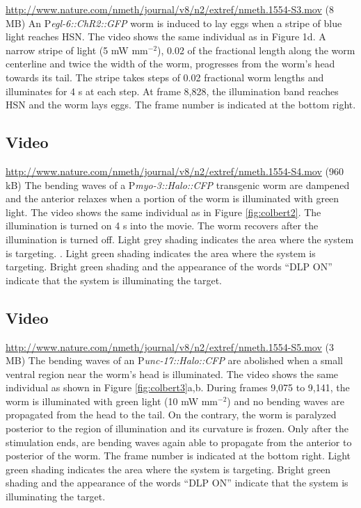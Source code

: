 \url{http://www.nature.com/nmeth/journal/v8/n2/extref/nmeth.1554-S3.mov} (8 MB)
An P\textit{egl-6::ChR2::GFP} worm is induced to lay eggs when a stripe of blue light reaches HSN. The video shows the same individual as in Figure 1d. A narrow stripe of light (5 mW mm$^{−2}$), 0.02 of the fractional length along the worm centerline and twice the width of the worm, progresses from the worm's head towards its tail. The stripe takes steps of 0.02 fractional worm lengths and illuminates for 4 s at each step. At frame 8,828, the illumination band reaches HSN and the worm lays eggs. The frame number is indicated at the bottom right.

\subsection{Video}\label{movie:colbert3} %

\url{http://www.nature.com/nmeth/journal/v8/n2/extref/nmeth.1554-S4.mov} (960 kB)
The bending waves of a P\textit{myo-3::Halo::CFP} transgenic worm are dampened and the anterior relaxes when a portion of the worm is illuminated with green light. The video shows the same individual as in Figure \ref{fig:colbert2}. The illumination is turned on 4 s into the movie. The worm recovers after the illumination is turned off. Light grey shading indicates the area where the system is targeting. . Light green shading indicates the area where the system is targeting. Bright green shading and the appearance of the words “DLP ON” indicate that the system is illuminating the target.

\subsection{Video}\label{movie:colbert4} %

\url{http://www.nature.com/nmeth/journal/v8/n2/extref/nmeth.1554-S5.mov} (3 MB)
The bending waves of an P\textit{unc-17::Halo::CFP} are abolished when a small ventral region near the worm's head is illuminated. The video shows the same individual as shown in Figure \ref{fig:colbert3}a,b. During frames 9,075 to 9,141, the worm is illuminated with green light (10 mW mm$^{−2}$) and no bending waves are propagated from the head to the tail. On the contrary, the worm is paralyzed posterior to the region of illumination and its curvature is frozen. Only after the stimulation ends, are bending waves again able to propagate from the anterior to posterior of the worm. The frame number is indicated at the bottom right. Light green shading indicates the area where the system is targeting. Bright green shading and the appearance of the words “DLP ON” indicate that the system is illuminating the target.

